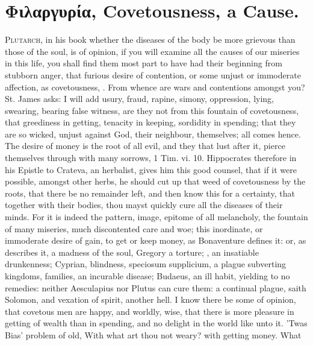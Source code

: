 {{%
\section{\textgreek{Φιλαργυρία}, Covetousness, a Cause.}

\lettrine{P}{lutarch}, in his book whether the diseases of the body be more
grievous than those of the soul, is of opinion, if you will examine all
the causes of our miseries in this life, you shall find them most part
to have had their beginning from stubborn anger, that furious desire of
contention, or some unjust or immoderate affection, as covetousness,
\etc{}. From whence are wars and contentions amongst you? St. James
asks: I will add usury, fraud, rapine, simony, oppression, lying,
swearing, bearing false witness, \etc{} are they not from this fountain of
covetousness, that greediness in getting, tenacity in keeping,
sordidity in spending; that they are so wicked, unjust against
God, their neighbour, themselves; all comes hence. The desire of money
is the root of all evil, and they that lust after it, pierce themselves
through with many sorrows, 1 Tim. vi. 10. Hippocrates therefore in his
Epistle to Crateva, an herbalist, gives him this good counsel, that if
it were possible,  amongst other herbs, he should cut up that
weed of covetousness by the roots, that there be no remainder left, and
then know this for a certainty, that together with their bodies, thou
mayst quickly cure all the diseases of their minds. For it is indeed
the pattern, image, epitome of all melancholy, the fountain of many
miseries, much discontented care and woe; this inordinate, or
immoderate desire of gain, to get or keep money, as Bonaventure
defines it: or, as \Austin{} describes it, a madness of the soul, Gregory
a torture; \Chrysostom{}, an insatiable drunkenness; Cyprian, blindness,
speciosum supplicium, a plague subverting kingdoms, families, an
incurable disease; Budaeus, an ill habit, yielding to no
remedies: neither Aesculapius nor Plutus can cure them: a continual
plague, saith Solomon, and vexation of spirit, another hell. I know
there be some of opinion, that covetous men are happy, and worldly,
wise, that there is more pleasure in getting of wealth than in
spending, and no delight in the world like unto it. 'Twas Bias'
problem of old, With what art thou not weary? with getting money. What
}}
